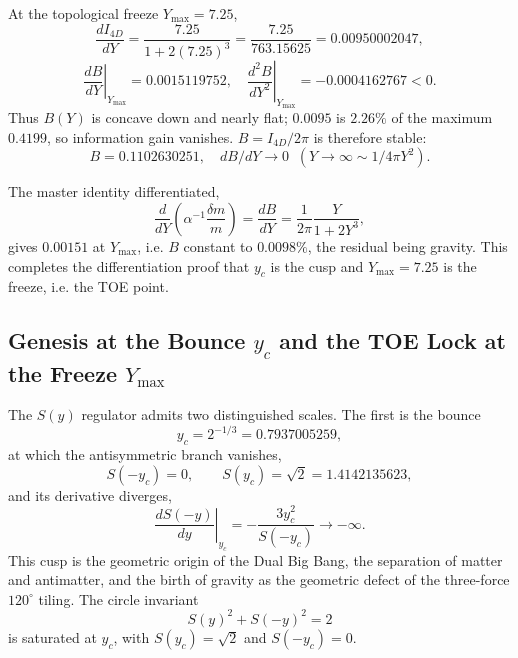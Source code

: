\documentclass[12pt,oneside,openany]{book}
\begin{document}
At the topological freeze $Y_{\max}=7.25$,
\begin{equation}
\frac{dI_{4D}}{dY}= \frac{7.25}{1+2(7.25)^3}= \frac{7.25}{763.15625}=0.00950002047,
\end{equation}
\begin{equation}
\boxed{\left.\frac{dB}{dY}\right|_{Y_{\max}}=0.0015119752},\quad
\boxed{\left.\frac{d^2B}{dY^2}\right|_{Y_{\max}}=-0.0004162767<0}.
\end{equation}
Thus $B(Y)$ is concave down and nearly flat; $0.0095$ is $2.26\%$ of
the maximum $0.4199$, so information gain vanishes. $B=I_{4D}/2\pi$
is therefore stable:
\begin{equation}
B=0.1102630251,\quad dB/dY\to0\;\;(Y\to\infty\sim1/4\pi Y^2).
\end{equation}

The master identity differentiated,
\begin{equation}
\frac{d}{dY}\left(\alpha^{-1}\frac{\delta m}{m}\right)=\frac{dB}{dY}
=\frac{1}{2\pi}\frac{Y}{1+2Y^3},
\end{equation}
gives $0.00151$ at $Y_{\max}$, i.e. $B$ constant to $0.0098\%$, the
residual being gravity. This completes the differentiation proof
that $y_c$ is the cusp and $Y_{\max}=7.25$ is the freeze, i.e. the
TOE point.
\subsection{Genesis at the Bounce $y_c$ and the TOE Lock at the Freeze $Y_{\max}$}
\label{sec:genesis-vs-lock}

The $S(y)$ regulator admits two distinguished scales. The first is the bounce
\begin{equation}
y_c = 2^{-1/3} = 0.7937005259,
\label{eq:yc}
\end{equation}
at which the antisymmetric branch vanishes,
\begin{equation}
S(-y_c) = 0, \qquad S(y_c) = \sqrt{2} = 1.4142135623,
\label{eq:Syc}
\end{equation}
and its derivative diverges,
\begin{equation}
\left.\frac{dS(-y)}{dy}\right|_{y_c} = -\frac{3y_c^2}{S(-y_c)} \to -\infty.
\label{eq:cusp-genesis}
\end{equation}
This cusp is the geometric origin of the Dual Big Bang, the separation of matter and antimatter, and the birth of gravity as the geometric defect of the three-force $120^\circ$ tiling. The circle invariant
\begin{equation}
S(y)^2 + S(-y)^2 = 2
\label{eq:circle-genesis}
\end{equation}
is saturated at $y_c$, with $S(y_c) = \sqrt{2}$ and $S(-y_c) = 0$.
\end{document}
